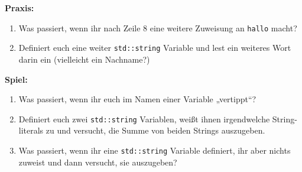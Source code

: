 \textbf{Praxis:}
\begin{enumerate}
    \item Was passiert, wenn ihr nach Zeile 8 eine weitere Zuweisung an
        \texttt{hallo} macht?
    \item Definiert euch eine weiter \texttt{std::string} Variable und lest ein
        weiteres Wort darin ein (vielleicht ein Nachname?)
\end{enumerate}

\textbf{Spiel:}
\begin{enumerate}
    \item Was passiert, wenn ihr euch im Namen einer Variable „vertippt“?
    \item Definiert euch zwei \texttt{std::string} Variablen, weißt ihnen
        irgendwelche String-literals zu und versucht, die Summe von beiden
        Strings auszugeben.
    \item Was passiert, wenn ihr eine \texttt{std::string} Variable definiert,
        ihr aber nichts zuweist und dann versucht, sie auszugeben?
\end{enumerate}
